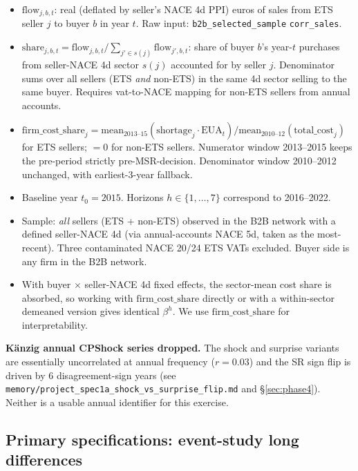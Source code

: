 \documentclass[11pt]{article}
\begin{document}
\begin{itemize}
  \item $\mathrm{flow}_{j,b,t}$: real (deflated by seller's NACE 4d PPI) euros of sales from ETS seller $j$ to buyer $b$ in year $t$. Raw input: \texttt{b2b\_selected\_sample} \texttt{corr\_sales}.
  \item $\mathrm{share}_{j,b,t} = \mathrm{flow}_{j,b,t} / \sum_{j' \in s(j)} \mathrm{flow}_{j',b,t}$: share of buyer $b$'s year-$t$ purchases from seller-NACE 4d sector $s(j)$ accounted for by seller $j$. Denominator sums over all sellers (ETS \emph{and} non-ETS) in the same 4d sector selling to the same buyer. Requires vat-to-NACE mapping for non-ETS sellers from annual accounts.
  \item $\mathrm{firm\_cost\_share}_j = \mathrm{mean}_{2013\text{--}15}(\mathrm{shortage}_j\cdot\mathrm{EUA}_t)/\mathrm{mean}_{2010\text{--}12}(\mathrm{total\_cost}_j)$ for ETS sellers; $= 0$ for non-ETS sellers. Numerator window 2013--2015 keeps the pre-period strictly pre-MSR-decision. Denominator window 2010--2012 unchanged, with earliest-3-year fallback.
  \item Baseline year $t_0 = 2015$. Horizons $h\in\{1,\ldots,7\}$ correspond to 2016--2022.
  \item Sample: \emph{all} sellers (ETS + non-ETS) observed in the B2B network with a defined seller-NACE 4d (via annual-accounts NACE 5d, taken as the most-recent). Three contaminated NACE 20/24 ETS VATs excluded. Buyer side is any firm in the B2B network.
  \item With buyer $\times$ seller-NACE 4d fixed effects, the sector-mean cost share is absorbed, so working with $\mathrm{firm\_cost\_share}$ directly or with a within-sector demeaned version gives identical $\beta^h$. We use $\mathrm{firm\_cost\_share}$ for interpretability.
\end{itemize}

\textbf{K\"anzig annual CPShock series dropped.} The shock and surprise variants are essentially uncorrelated at annual frequency ($r = 0.03$) and the SR sign flip is driven by 6 disagreement-sign years (see \texttt{memory/project\_spec1a\_shock\_vs\_surprise\_flip.md} and \S\ref{sec:phase4}). Neither is a usable annual identifier for this exercise.

\subsection{Primary specifications: event-study long differences}
\end{document}
